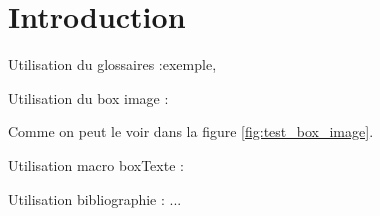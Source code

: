 \chapter{Introduction}
    \lipsum[1]
    
    \vspace{2pt}
    Utilisation du glossaires :\gls{exemple}, 

    \vspace{2pt}
    Utilisation du box image : 
    
    
    Comme on peut le voir dans la figure \ref{fig:test_box_image}.
    
    Utilisation macro boxTexte :
    
    
    Utilisation bibliographie : ...\cite{musicclassification:book}

    
